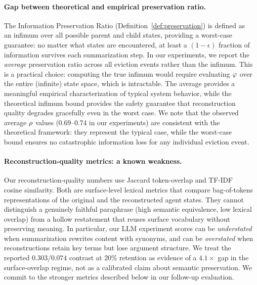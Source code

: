 \paragraph{Gap between theoretical and empirical preservation ratio.}
The Information Preservation Ratio (Definition~\ref{def:preservation})
is defined as an infimum over all possible parent and child states,
providing a worst-case guarantee: no matter what states are
encountered, at least a $(1-\epsilon)$ fraction of information
survives each summarization step.  In our experiments, we report the
\emph{average} preservation ratio across all eviction events rather
than the infimum.  This is a practical choice: computing the true
infimum would require evaluating $\varphi$ over the entire
(infinite) state space, which is intractable.  The average provides
a meaningful empirical characterization of typical system behavior,
while the theoretical infimum bound provides the safety guarantee
that reconstruction quality degrades gracefully even in the worst
case.  We note that the observed average $\rho$ values
(0.69--0.74 in our experiments) are consistent with the theoretical
framework: they represent the typical case, while the worst-case
bound ensures no catastrophic information loss for any individual
eviction event.

\paragraph{Reconstruction-quality metrics: a known weakness.}
Our reconstruction-quality numbers use Jaccard token-overlap and
TF-IDF cosine similarity.  Both are surface-level lexical metrics
that compare bag-of-tokens representations of the original and the
reconstructed agent states.  They cannot distinguish a genuinely
faithful paraphrase (high semantic equivalence, low lexical overlap)
from a hollow restatement that reuses surface vocabulary without
preserving meaning.  In particular, our LLM experiment scores can be
\emph{understated} when summarization rewrites content with
synonyms, and can be \emph{overstated} when reconstructions retain
key terms but lose argument structure.  We treat the reported
$0.303$/$0.074$ contrast at 20\% retention as evidence of a
$4.1\times$ gap in the surface-overlap regime, not as a calibrated
claim about semantic preservation.  We commit to the stronger
metrics described below in our follow-up evaluation.

